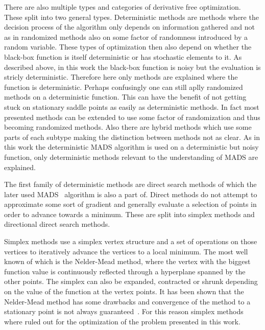 \documentclass[a4paper,10pt]{article}
\begin{document}
    There are also multiple types and categories of derivative
    free optimization.
    These split into two general types.
    Deterministic methods are methods where the decision process of
    the algorithm only depends on information gathered and not
    as in randomized methods also on some factor of randomness
    introduced by a random variable.
    These types of optimization then also depend on whether the
    black-box function is itself deterministic or has stochastic
    elements to it.
    As described above, in this work the black-box function is
    noisy but the evaluation is stricly deterministic.
    Therefore here only methods are explained where the function
    is deterministic.
    Perhaps confusingly one can still aplly randomized methods on
    a deterministic function.
    This can have the benefit of not getting stuck on stationary
    saddle points as easily as deterministic methods.
    In fact most presented methods can be extended to use some
    factor of randomization and thus becoming randomized
    methods.
    Also there are hybrid methods which use some parts of
    each subtype making the distinction between methods not
    as clear.
    As in this work the deterministic MADS algorithm is used on
    a deterministic but noisy function, only
    deterministic methods relevant to the understanding of
    MADS are explained.
    
    The first family of deterministic methods are direct search methods of which
    the later used MADS~\cite{mads_original} algorithm is also a 
    part of.
    Direct methods do not attempt to approximate some sort of gradient
    and generally evaluate a selection of points in order to advance
    towards a minimum.
    These are split into simplex methods and directional direct
    search methods.
    
    Simplex methods use a simplex vertex structure and a set
    of operations on those vertices to iteratively advance the vertices
    to a local minimum.
    The most well known of which is the Nelder-Mead method, where
    the vertex with the biggest function value is continuously
    reflected through a hyperplane spanned by the other points.
    The simplex can also be expanded, contracted or shrunk depending
    on the value of the function at the vertex points.
    It has been shown that the Nelder-Mead method has some drawbacks
    and convergence of the method to a stationary point is not always
    guaranteed~\cite{derivative_free_methods}.
    For this reason simplex methods where ruled out for the optimization
    of the problem presented in this work.
    
\end{document}
